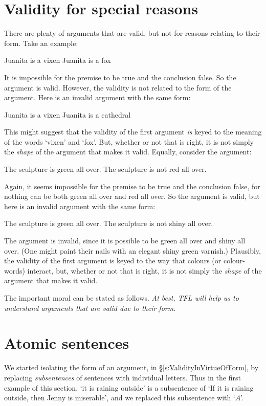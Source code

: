 \section{Validity for special reasons}
There are plenty of arguments that are valid, but not for reasons relating to their form. Take an example:
	\begin{earg}
		\prem Juanita is a vixen
		\conc Juanita is a fox
	\end{earg}
It is impossible for the premise to be true and the conclusion false. So the argument is valid. However, the validity is not related to the form of the argument. Here is an invalid argument with the same form:
	\begin{earg}
		\prem Juanita is a vixen
		\conc Juanita is a cathedral
	\end{earg}
This might suggest that the validity of the first argument \emph{is} keyed to the meaning of the words `vixen' and `fox'. But, whether or not that is right, it is not simply the \emph{shape} of the argument that makes it valid. Equally, consider the argument:
	\begin{earg}
		\prem The sculpture is green all over.
		\conc The sculpture is not red all over. 
	\end{earg}
Again, it seems impossible for the premise to be true and the conclusion false, for nothing can be both green all over and red all over. So the argument is valid, but here is an invalid argument with the same form:
	\begin{earg}
		\prem The sculpture is green all over.
		\conc The sculpture is not shiny all over.
	\end{earg}
The argument is invalid, since it is possible to be green all over and shiny all over. (One might paint their nails with an elegant shiny green varnish.) Plausibly, the validity of the first argument is keyed to the way that colours (or colour-words) interact, but, whether or not that is right, it is not simply the \emph{shape} of the argument that makes it valid. 

The important moral can be stated as follows. \emph{At best, TFL will help us to understand arguments that are valid due to their form.}

\section{Atomic sentences}

We started isolating the form of an argument, in \S\ref{s:ValidityInVirtueOfForm}, by replacing  \emph{subsentences} of sentences with individual letters. Thus in the first example of this section, `it is raining outside' is a subsentence of `If it is raining outside, then Jenny is miserable', and we replaced this subsentence with `$A$'. 

